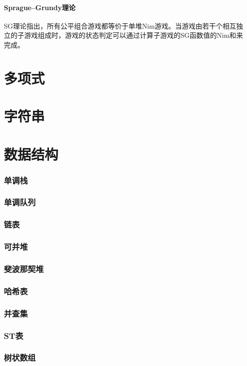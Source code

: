 \documentclass[12pt,a4paper]{article}
\begin{document}
\subsection{Sprague–Grundy理论}
SG理论指出，所有公平组合游戏都等价于单堆Nim游戏。当游戏由若干个相互独立的子游戏组成时，游戏的状态判定可以通过计算子游戏的SG函数值的Nim和来完成。

\newpage
\part{多项式}

\newpage
\part{字符串}

\newpage
\part{数据结构} %
\section{单调栈 }%
\section{单调队列}
\section{链表} %
\section{可并堆} %
\section{斐波那契堆}
\section{哈希表} %
\section{并查集}
\section{ST表}
\section{树状数组}
\end{document}
